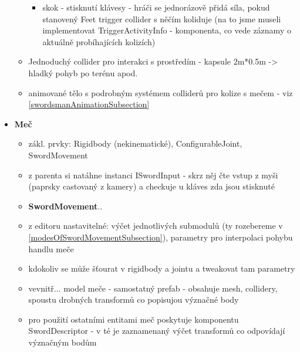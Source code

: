 \begin{itemize}
\begin{itemize}
\begin{itemize}
          \item skok - stisknutí klávesy - hráči se jednorázově přidá síla, pokud stanovený Feet trigger collider s něčím koliduje (na to jsme museli implementovat TriggerActivityInfo - komponenta, co vede záznamy o aktuálně probíhajících kolizích)
        \end{itemize}
       \item Jednoduchý collider pro interakci s prostředím - kapsule 2m*0.5m -> hladký pohyb po terénu apod.
       \item animované tělo s podrobným systémem colliderů pro kolize s mečem - viz \ref{swordsmanAnimationSubsection}
    \end{itemize}
  \item \textbf{Meč}
    \begin{itemize}
      \item zákl. prvky: Rigidbody (nekinematické), ConfigurableJoint, SwordMovement
      \item z parenta si natáhne instanci ISwordInput - skrz něj čte vstup z myši (paprsky castovaný z kamery) a checkuje u kláves zda jsou stisknuté
      \item \textbf{SwordMovement}..
      \item z editoru nastavitelné: výčet jednotlivých submodulů (ty rozebereme v \ref{modesOfSwordMovementSubsection}), parametry pro interpolaci pohybu handlu meče
      \item kdokoliv se může šťourat v rigidbody a jointu a tweakovat tam parametry
      \item vevnitř... model meče - samostatný prefab - obsahuje mesh, collidery, spoustu drobných transformů co popisujou význačné body
      \item pro použití ostatními entitami meč poskytuje komponentu SwordDescriptor - v té je zaznamenaný výčet transformů co odpovídají význačným bodům
    \end{itemize}
\end{itemize}


